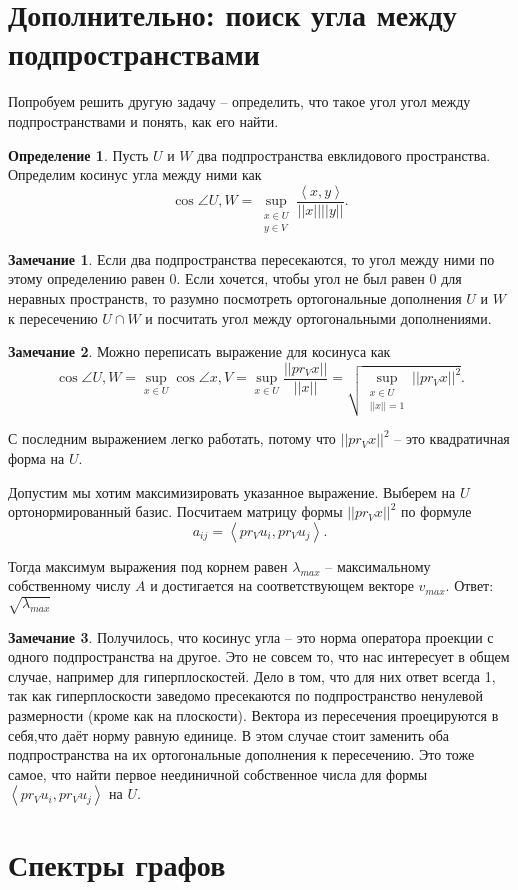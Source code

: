 \documentclass[10pt,a4paper,oneside]{book}
\theoremstyle{definition}
\newtheorem*{rem}{Замечание}
\newtheorem*{defn}{Определение}
\def\lan{\left\langle }
\def\ran{\right\rangle}
\def\dfn{\begin{defn}}
\def\edfn{\end{defn}}
\def\rm{\begin{rem}}
\def\erm{\end{rem}}
\begin{document}
\section*{Дополнительно: поиск угла между подпространствами}
Попробуем решить другую задачу -- определить, что такое угол угол между подпространствами и понять, как его найти. 

\dfn
Пусть $U$ и $W$ два подпространства  евклидового пространства. Определим косинус угла между ними как 
$$\cos \angle U,W= \sup_{\substack{ x\in U\\ y\in V}} \frac{\lan x,y\ran}{||x|| ||y||}.$$
\edfn

\rm Если два подпространства пересекаются, то угол между ними по этому определению равен 0. Если хочется, чтобы угол не был равен 0 для неравных пространств, то разумно посмотреть ортогональные дополнения $U$ и $W$ к пересечению $U\cap W$ и посчитать угол между ортогональными дополнениями. 
\erm

\rm Можно переписать выражение для косинуса как $$\cos \angle U,W= \sup_{ x\in U} \cos \angle x, V = \sup_{x\in U} \frac{||pr_V x||}{||x||}= \sqrt{ \sup_{\substack{x\in U\\ ||x||=1}} ||pr_V x||^2} .$$
\erm

С последним выражением легко работать, потому что $||pr_V x||^2$ -- это квадратичная форма на $U$.

Допустим мы хотим максимизировать указанное выражение. Выберем на $U$ ортонормированный базис. Посчитаем матрицу формы $||pr_V x||^2$ по формуле 
$$a_{ij}= \lan pr_V u_i, pr_V u_j\ran.$$

Тогда максимум выражения под корнем равен $\lambda_{max}$ -- максимальному собственному числу $A$ и достигается на соответствующем векторе $v_{max}$. Ответ: $\sqrt{\lambda_{max}}$

\rm Получилось, что косинус угла -- это норма оператора проекции с одного подпространства на другое. Это не совсем то, что нас интересует в общем случае, например для гиперплоскостей. Дело в том, что для них ответ всегда 1, так как гиперплоскости заведомо пресекаются по подпространство ненулевой размерности (кроме как на плоскости). Вектора из пересечения проецируются в себя,что даёт норму равную единице. В этом случае стоит заменить оба подпространства на их ортогональные дополнения к пересечению. Это тоже самое, что найти первое неединичной собственное числа для формы  $\lan pr_V u_i, pr_V u_j\ran$ на $U$.
\erm




\section{Спектры графов}
\end{document}
